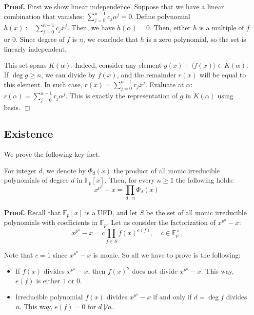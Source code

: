 \documentclass{template}
\newcommand{\qedwhite}{\hfill \ensuremath{\Box}}
\begin{document}
\textbf{Proof.} First we show linear independence. Suppose that we have a linear
combination that vanishes: $\sum_{j=0}^{n-1}c_j\alpha^j=0$. Define polynomial
$h(x) := \sum_{j=0}^{n-1}c_jx^j$. Then, we have $h(\alpha)=0$. Then, either $h$
is a multiple of $f$ or $0$. Since degree of $f$ is $n$, we conclude that $h$ is
a zero polynomial, so the set is linearly independent.

This set spans $K(\alpha)$. Indeed, consider any element $g(x)+\langle f(x)
\rangle \in K(\alpha)$. If $\deg g \geq n$, we can divide by $f(x)$, and the
remainder $r(x)$ will be equal to this element. In such case, $r(x) =
\sum_{j=0}^{n-1}r_jx^j$. Evaluate at $\alpha$:
$r(\alpha)=\sum_{j=0}^{n-1}r_j\alpha^j$. This is exactly the representation of
$g$ in $K(\alpha)$ using basis. \qedwhite

\subsection{Existence}\label{section:existence}

We prove the following key fact.
\begin{proposition}\label{theorem:product-irreducible} For integer $d$, we denote by
    $\Phi_d(x)$ the product of all monic irreducible polynomials of degree
    $d$ in $\mathbb{F}_{p}[x]$. Then, for every $n \geq 1$ the following holds:
    \begin{equation*}
        x^{p^n}-x = \prod_{d \mid n}\Phi_d(x)
    \end{equation*}
\end{proposition} 

\textbf{Proof.} Recall that $\mathbb{F}_p[x]$ is a UFD, and let $S$ be the set
of all monic irreducible polynomials with coefficients in $\mathbb{F}_p$. Let us
consider the factorization of $x^{p^n}-x$:
\begin{equation*}
    x^{p^n}-x = c\prod_{f \in S}f(x)^{e(f)}, \quad c \in \mathbb{F}_p^{\times}.
\end{equation*}

Note that $c=1$ since $x^{p^n}-x$ is monic. So all we have to prove is the
following:
\begin{itemize}
    \item[\textit{(i)}] If $f(x)$ divides $x^{p^n}-x$, then $f(x)^2$ does not
    divide $x^{p^n}-x$. This way, $e(f)$ is either $1$ or $0$.
    \item[\textit{(ii)}] Irreducible polynomial $f(x)$ divides $x^{p^n}-x$ if
    and only if $d = \deg f$ divides $n$. This way, $e(f)=0$ for $d \not\mid n$.
\end{itemize}
\end{document}
